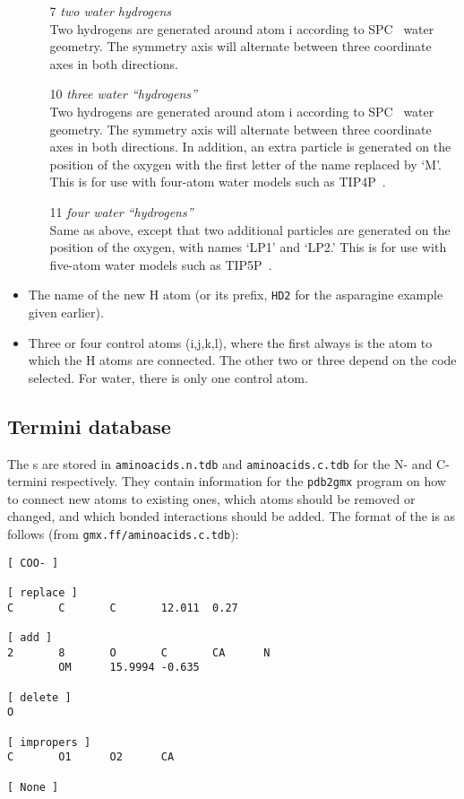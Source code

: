 \begin{itemize}
\begin{enumerate}
\item[7]{\em two water hydrogens}\\
Two hydrogens are generated around atom i according to
SPC~\cite{Berendsen81} water geometry. The symmetry axis will
alternate between three coordinate axes in both directions.

\item[10]{\em three water ``hydrogens''}\\
Two hydrogens are generated around atom i according to
SPC~\cite{Berendsen81} water geometry. The symmetry axis will
alternate between three coordinate axes in both directions. In addition,
an extra particle is generated on the position of the oxygen with
the first letter of the name replaced by `M'. This is for
use with four-atom water models such as TIP4P~\cite{Jorgensen83}.

\item[11]{\em four water ``hydrogens''}\\
Same as above, except that two additional
particles are generated on the position of the oxygen, with names
`LP1' and `LP2.' This is for
use with five-atom water models such as TIP5P~\cite{Mahoney2000a}.
\end{enumerate}

\item
The name of the new H atom (or its prefix, {\eg} {\tt HD2} for
the asparagine example given earlier).

\item
Three or four control atoms (i,j,k,l), where the first always is the
atom to which the H atoms are connected. The other two or three depend
on the code selected. For water, there is only one control atom.
\end{itemize}

\subsection{Termini database}
\label{subsec:tdb}
The s are stored in {\tt aminoacids.n.tdb} and
{\tt aminoacids.c.tdb} for the N- and C-termini respectively. They contain
information for the {\tt pdb2gmx} program on how to connect new atoms
to existing ones, which atoms should be removed or changed, and which
bonded interactions should be added. The format of the is as follows
(from {\tt gmx.ff/aminoacids.c.tdb}):

{\small
\begin{verbatim}
[ COO- ]

[ replace ]
C       C       C       12.011  0.27

[ add ]
2       8       O       C       CA      N
        OM      15.9994 -0.635

[ delete ]
O

[ impropers ]
C       O1      O2      CA

[ None ]
\end{verbatim}}

